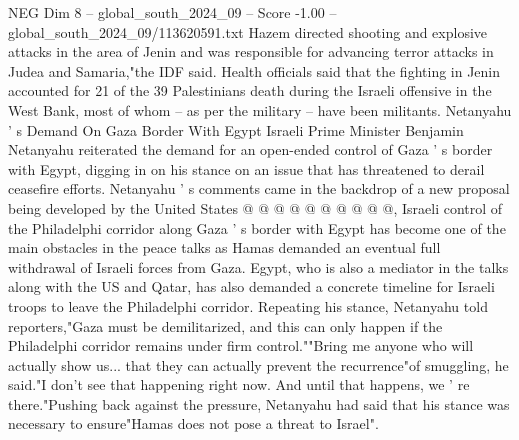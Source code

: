 \begin{textsample}{NEG Dim 8 – global\_south\_2024\_09 – Score -1.00 – global\_south\_2024\_09/113620591.txt}
Hazem directed shooting and explosive attacks in the area of Jenin and was responsible for advancing terror attacks in Judea and Samaria,"the IDF said.
Health officials said that the fighting in Jenin accounted for 21 of the 39 Palestinians death during the Israeli offensive in the West Bank, most of whom -- as per the military -- have been militants.
Netanyahu ' s Demand On Gaza Border With Egypt Israeli Prime Minister Benjamin Netanyahu reiterated the demand for an open-ended control of Gaza ' s border with Egypt, digging in on his stance on an issue that has threatened to derail ceasefire efforts.
Netanyahu ' s comments came in the backdrop of a new proposal being developed by the United States @ @ @ @ @ @ @ @ @ @, Israeli control of the Philadelphi corridor along Gaza ' s border with Egypt has become one of the main obstacles in the peace talks as Hamas demanded an eventual full withdrawal of Israeli forces from Gaza.
Egypt, who is also a mediator in the talks along with the US and Qatar, has also demanded a concrete timeline for Israeli troops to leave the Philadelphi corridor.
Repeating his stance, Netanyahu told reporters,"Gaza must be demilitarized, and this can only happen if the Philadelphi corridor remains under firm control.""Bring me anyone who will actually show us... that they can actually prevent the recurrence"of smuggling, he said."I don't see that happening right now.
And until that happens, we ' re there."Pushing back against the pressure, Netanyahu had said that his stance was necessary to ensure"Hamas does not pose a threat to Israel".

\end{textsample}
